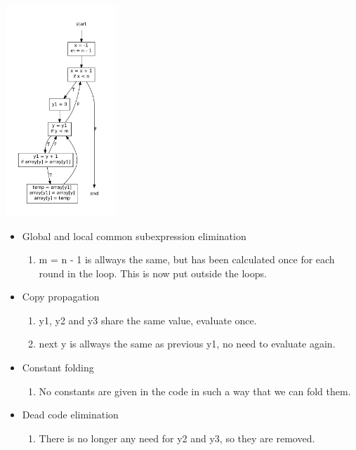 \documentclass[english,a4paper]{scrartcl}
\begin{document}
 \begin{minipage}[b]{0.5\linewidth}
 \centering
\subsubsection{}
\includegraphics[height=300px]{flowgraph_optimized.pdf}
 \end{minipage}
  \hspace{0.5cm}
 \begin{minipage}[b]{0.5\linewidth}
 \centering
 \begin{itemize}
    \item
 Global and local common subexpression elimination
 \begin{enumerate}
   \item m = n - 1 is allways the same, but has been calculated once for each
   round in the loop. This is now put outside the loops.
 \end{enumerate}
    \item
    Copy propagation
    \begin{enumerate}
      \item y1, y2 and y3 share the same value, evaluate once.
      \item next y is allways the same as previous y1, no need to evaluate
      again.
    \end{enumerate}
   \item 
Constant folding
\begin{enumerate}
  \item No constants are given in the code in such a way that we can fold them.
\end{enumerate}
   \item 
 Dead code elimination
 \begin{enumerate}
   \item There is no longer any need for y2 and y3, so they are removed. 
 \end{enumerate}
 \end{itemize}
 \end{minipage}
 \newpage
\end{document}

